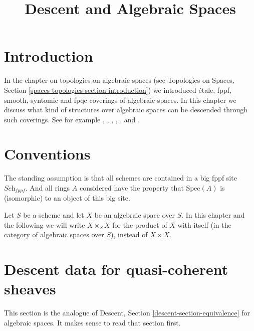 

%


\title{Descent and Algebraic Spaces}

\maketitle

\label{section-phantom}

\tableofcontents

\section{Introduction}
\label{section-introduction}

\noindent
In the chapter on topologies on algebraic spaces (see
Topologies on Spaces, Section \ref{spaces-topologies-section-introduction})
we introduced \'etale, fppf, smooth, syntomic and fpqc coverings of
algebraic spaces.
In this chapter we discuss what kind of structures over algebraic spaces
can be descended through such coverings.
See for example \cite{Gr-I}, \cite{Gr-II}, \cite{Gr-III},
\cite{Gr-IV}, \cite{Gr-V}, and \cite{Gr-VI}.



\section{Conventions}
\label{section-conventions}

\noindent
The standing assumption is that all schemes are contained in
a big fppf site $\textit{Sch}_{fppf}$. And all rings $A$ considered
have the property that $\text{Spec}(A)$ is (isomorphic) to an
object of this big site.

\medskip\noindent
Let $S$ be a scheme and let $X$ be an algebraic space over $S$.
In this chapter and the following we will write $X \times_S X$
for the product of $X$ with itself (in the category of algebraic
spaces over $S$), instead of $X \times X$.






\section{Descent data for quasi-coherent sheaves}
\label{section-equivalence}

\noindent
This section is the analogue of
Descent, Section \ref{descent-section-equivalence}
for algebraic spaces.
It makes sense to read that section first.

